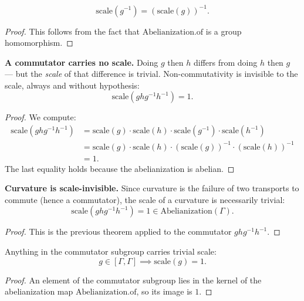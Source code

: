 \begin{theorem}
\[
\text{scale}(g^{-1}) = (\text{scale}(g))^{-1}.
\]
\begin{proof}
This follows from the fact that $\text{Abelianization.of}$ is a group homomorphism.
\end{proof}
\end{theorem}

\begin{theorem}
\textbf{A commutator carries no scale.} Doing $g$ then $h$ differs from doing $h$ then $g$ — but the \emph{scale} of that difference is trivial. Non-commutativity is invisible to the scale, always and without hypothesis:
\[
\text{scale}(g h g^{-1} h^{-1}) = 1.
\]
\begin{proof}
We compute:
\begin{align*}
\text{scale}(g h g^{-1} h^{-1}) &= \text{scale}(g) \cdot \text{scale}(h) \cdot \text{scale}(g^{-1}) \cdot \text{scale}(h^{-1})\\
&= \text{scale}(g) \cdot \text{scale}(h) \cdot (\text{scale}(g))^{-1} \cdot (\text{scale}(h))^{-1}\\
&= 1.
\end{align*}
The last equality holds because the abelianization is abelian.
\end{proof}
\end{theorem}

\begin{theorem}
\textbf{Curvature is scale-invisible.} Since curvature is the failure of two transports to commute (hence a commutator), the scale of a curvature is necessarily trivial:
\[
\text{scale}(g h g^{-1} h^{-1}) = 1 \in \text{Abelianization}(\Gamma).
\]
\begin{proof}
This is the previous theorem applied to the commutator $g h g^{-1} h^{-1}$.
\end{proof}
\end{theorem}

\begin{theorem}
Anything in the commutator subgroup carries trivial scale:
\[
g \in [\Gamma, \Gamma] \implies \text{scale}(g) = 1.
\]
\begin{proof}
An element of the commutator subgroup lies in the kernel of the abelianization map $\text{Abelianization.of}$, so its image is $1$.
\end{proof}
\end{theorem}

